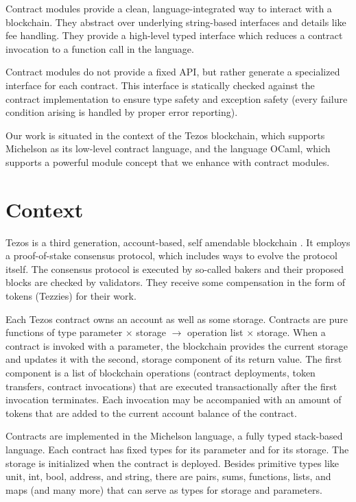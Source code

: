 \documentclass[a4paper,USenglish,american,cleveref, autoref, thm-restate]{oasics-v2021}
\begin{document}
Contract modules provide a clean, language-integrated way to interact
with a blockchain. They abstract over underlying string-based
interfaces and details like fee handling. They provide a high-level
typed interface which reduces a contract invocation to a function call
in the language.

Contract modules do not provide a fixed API, but
rather generate a specialized interface for each contract. This
interface is statically checked against the contract implementation to
ensure type safety and exception safety (every failure condition
arising is handled by proper error reporting).

Our work is situated in the context of the Tezos blockchain, which
supports Michelson as its low-level contract language, and the
language OCaml, which supports a powerful module concept that we
enhance with contract modules. 

\section{Context}
\label{sec:context}

Tezos is a third generation, account-based, self amendable
blockchain \cite{tezos-whitepaper}. It employs a proof-of-stake consensus protocol, which
includes ways to evolve the protocol itself. The consensus protocol is
executed by so-called bakers and their proposed blocks are checked by
validators. They receive some compensation in the form of
tokens (Tezzies) for their work.

Each Tezos contract owns an account as well as some storage. Contracts
are pure functions of type parameter $\times$ storage $\to$ operation
list $\times$ storage. When a contract is invoked with a parameter,
the blockchain provides the current storage and updates it with the
second, storage component of its return value. The first component is
a list of blockchain operations (contract deployments, token
transfers, contract invocations) that are executed transactionally
after the first invocation terminates. Each invocation may be
accompanied with an amount of tokens that are added to the current
account balance of the contract.

Contracts are implemented in the Michelson language, a fully typed
stack-based language. Each contract has fixed types for its parameter
and for its storage. The storage is initialized when the contract is
deployed. Besides primitive types like unit, int, bool, address, and string,
there are pairs, sums, functions, lists, and maps (and many more) that
can serve as types for storage and parameters.
\end{document}
